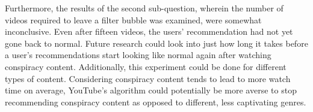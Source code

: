 \documentclass[../main.tex]{subfiles}
\begin{document}
Furthermore, the results of the second sub-question, wherein the number of videos required to leave a filter bubble was
examined, were somewhat inconclusive. Even after fifteen videos, the users' recommendation had not yet gone back to
normal. Future research could look into just how long it takes before a user's recommendations start looking like normal
again after watching conspiracy content. Additionally, this experiment could be done for different types of content.
Considering conspiracy content tends to lead to more watch time on average, YouTube's algorithm could potentially be
more averse to stop recommending conspiracy content as opposed to different, less captivating genres. 
\end{document}
